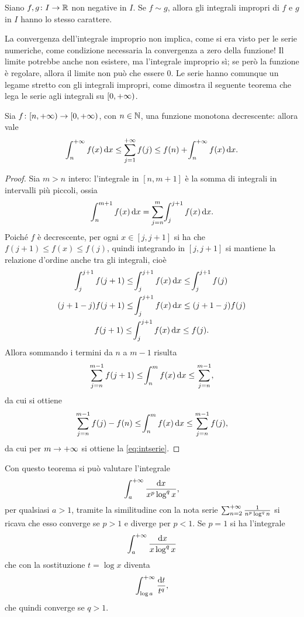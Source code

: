 \begin{corollario} \label{t:confronto_asintotico_int}
Siano $f,g\colon I\to\mathbb{R}$ non negative in $I$. Se $f\sim g$, allora gli integrali impropri di $f$ e $g$ in $I$ hanno lo stesso carattere.
\end{corollario}
La convergenza dell'integrale improprio non implica, come si era visto per le serie numeriche, come condizione necessaria la convergenza a zero della funzione! Il limite potrebbe anche non esistere, ma l'integrale improprio sì; se però la funzione è regolare, allora il limite non può che essere 0. Le serie hanno comunque un legame stretto con gli integrali impropri, come dimostra il seguente teorema che lega le serie agli integrali su $[0,+\infty)$.
\begin{teorema} \label{t:intserie}
Sia $f\colon[n,+\infty)\to[0,+\infty)$, con $n\in\mathbb{N}$, una funzione monotona decrescente: allora vale
\begin{equation} \label{eq:intserie}
\int_n^{+\infty} f(x)\,\textup{d} x\leq\sum_{{j}=1}^{+\infty}f(j)\leq f(n)+\!\int_n^{+\infty} f(x)\,\textup{d} x.
\end{equation}
\end{teorema}
\begin{proof}
Sia $m>n$ intero: l'integrale in $[n,m+1]$ è la somma di integrali in intervalli più piccoli, ossia
\[
\int_n^{m+1}f(x)\,\textup{d} x=\sum_{j=n}^{m}\!\int_j^{j+1}f(x)\,\textup{d} x.
\]
Poiché $f$ è decrescente, per ogni $x\in[j,j+1]$ si ha che $f(j+1)\leq f(x)\leq f(j)$, quindi integrando in $[j,j+1]$ si mantiene la relazione d'ordine anche tra gli integrali, cioè
\begin{gather*}
\!\int_j^{j+1}f(j+1)\leq\!\int_j^{j+1}f(x)\,\textup{d} x\leq\!\int_j^{j+1}f(j)\\
(j+1-j)f(j+1)\leq\!\int_j^{j+1}f(x)\,\textup{d} x\leq(j+1-j)f(j)\\
f(j+1)\leq\!\int_j^{j+1}f(x)\,\textup{d} x\leq f(j).
\end{gather*}
Allora sommando i termini da $n$ a $m-1$ risulta
\[
\sum_{j=n}^{m-1}f(j+1)\leq\!\int_n^m f(x)\,\textup{d} x\leq\sum_{j=n}^{m-1},
\]
da cui si ottiene
\[
\sum_{j=n}^{m-1}f(j)-f(n)\leq\!\int_n^m f(x)\,\textup{d} x\leq\sum_{j=n}^{m-1}f(j),
\]
da cui per $m\to+\infty$ si ottiene la \eqref{eq:intserie}.
\end{proof}
Con questo teorema si può valutare l'integrale
\[
\int_a^{+\infty}\frac{\textup{d} x}{x^p\log^qx},
\]
per qualsiasi $a>1$, tramite la similitudine con la nota serie $\sum_{n=2}^{+\infty}\frac1{n^p\log^qn}$ si ricava che esso converge se $p>1$ e diverge per $p<1$. Se $p=1$ si ha l'integrale
\[
\int_a^{+\infty}\frac{\textup{d} x}{x\log^qx}
\]
che con la sostituzione $t=\log x$ diventa
\[
\int_{\log a}^{+\infty}\frac{\textup{d} t}{t^q},
\]
che quindi converge se $q>1$.
